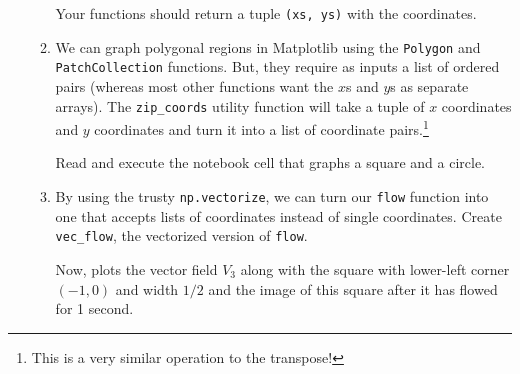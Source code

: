 \documentclass[letter]{article}
\begin{document}
\begin{enumerate}
\begin{enumerate}
					Your functions should return a tuple {\tt (xs, ys)} with the coordinates.
				\item We can graph polygonal regions in Matplotlib using the {\tt Polygon} and {\tt PatchCollection}
					functions. But, they require as inputs a list of ordered pairs (whereas most other
					functions want the $x$s and $y$s as separate arrays). The \verb|zip_coords| utility function
					will take a tuple of $x$ coordinates and $y$ coordinates and turn it into a list
					of coordinate pairs.\footnote{This is a very similar operation to the transpose!}

					Read and execute the notebook cell that graphs a square and a circle.
				\item By using the trusty {\tt np.vectorize}, we can turn our {\tt flow} function into one
					that accepts lists of coordinates instead of single coordinates. Create \verb|vec_flow|,
					the vectorized version of {\tt flow}.

					Now, plots the vector field $V_3$ along with the square with lower-left corner $(-1,0)$ and
					width $1/2$ and the image of this square after it has flowed for 1 second.
			\end{enumerate}
	\end{enumerate}
\end{document}
